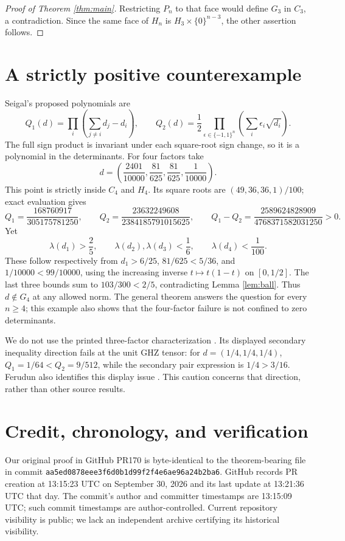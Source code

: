 \documentclass[11pt]{article}
\newcommand{\lam}{\lambda}
\begin{document}
\begin{proof}[Proof of Theorem \ref{thm:main}]
Restricting \(P_n\) to that face would define \(G_3\) in \(C_3\), a contradiction. Since the same face of \(H_n\) is \(H_3\times\{0\}^{n-3}\), the other assertion follows.
\end{proof}

\section{A strictly positive counterexample}
Seigal's proposed polynomials \cite[Conjecture 1.5]{Seigal} are
\[
 Q_1(d)=\prod_i\left(\sum_{j\ne i}d_j-d_i\right),\qquad
 Q_2(d)=\frac12\prod_{\epsilon\in\{-1,1\}^n}
                     \left(\sum_i\epsilon_i\sqrt{d_i}\right).
\]
The full sign product is invariant under each square-root sign change, so it is a polynomial in the determinants.
For four factors take
\[
 d=\left(\frac{2401}{10000},\frac{81}{625},
                 \frac{81}{625},\frac1{10000}\right).
\]
This point is strictly inside \(C_4\) and \(H_4\). Its square roots are \((49,36,36,1)/100\); exact evaluation gives
\[
 Q_1=\frac{168760917}{305175781250},\qquad
 Q_2=\frac{23632249608}{2384185791015625},\qquad
 Q_1-Q_2=\frac{2589624828909}{4768371582031250}>0.
\]
Yet
\[
 \lam(d_1)>\frac25,\qquad \lam(d_2),\lam(d_3)<\frac16,\qquad
 \lam(d_4)<\frac1{100}.
\]
These follow respectively from \(d_1>6/25\), \(81/625<5/36\), and \(1/10000<99/10000\), using the increasing inverse \(t\mapsto t(1-t)\) on \([0,1/2]\). The last three bounds sum to \(103/300<2/5\), contradicting Lemma \ref{lem:ball}. Thus \(d\notin G_4\) at any allowed norm. The general theorem answers the question for every \(n\geq4\); this example also shows that the four-factor failure is not confined to zero determinants.

We do not use the printed three-factor characterization \cite[Theorem 1.4]{Seigal}. Its displayed secondary inequality direction fails at the unit GHZ tensor: for \(d=(1/4,1/4,1/4)\), \(Q_1=1/64<Q_2=9/512\), while the secondary pair expression is \(1/4>3/16\). Ferudun also identifies this display issue \cite{Ferudun}. This caution concerns that direction, rather than other source results.

\section{Credit, chronology, and verification}
Our original proof in GitHub PR170 \cite{GitHub} is byte-identical to the theorem-bearing file in commit
\texttt{aa5ed0878eee3f6d0b1d99f2f4e6ae96a24b2ba6}.
GitHub records PR creation at 13:15:23 UTC on September 30, 2026 and its last update at 13:21:36 UTC that day. The commit's author and committer timestamps are 13:15:09 UTC; such commit timestamps are author-controlled. Current repository visibility is public; we lack an independent archive certifying its historical visibility.
\end{document}
